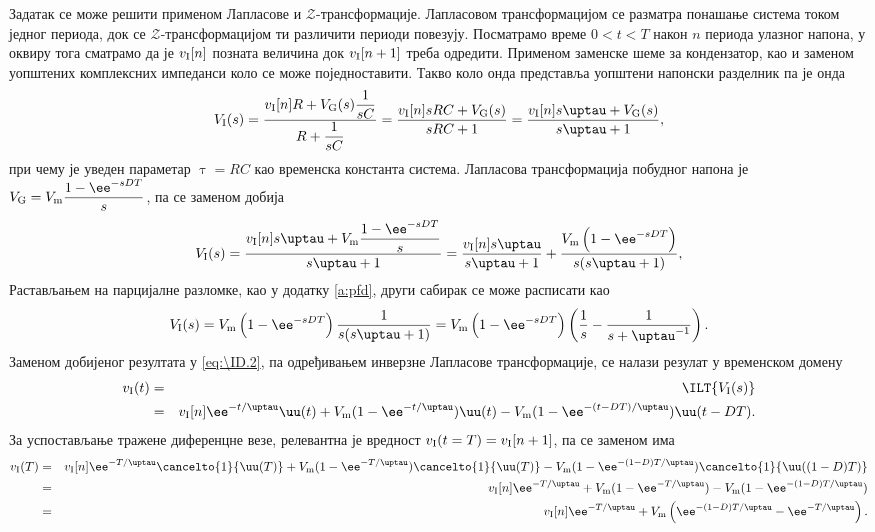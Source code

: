 Задатак се може решити применом Лапласове и $\mathcal{Z}$-трансформације. Лапласовом трансформацијом се разматра понашање система током једног периода, 
док се $\mathcal{Z}$-трансформацијом ти различити периоди повезују. Посматрамо време $0 < t < T$ након $n$ периода улазног напона, у оквиру тога 
сматрамо да је $v_{\rm I}[n]$ позната величина док $v_{\rm I}[n+1]$ треба одредити. Применом заменске шеме за кондензатор, као и заменом уопштених 
комплексних импеданси коло се може поједноставити. Такво коло онда представља уопштени напонски разделник па је онда 
\begin{eqnarray}
    V_{\rm I}(s) = \dfrac{v_{\rm I}[n] R + V_{\rm G}(s) \dfrac{1}{sC}}{R + \dfrac{1}{sC}} = 
    \dfrac{v_{\rm I}[n] sRC + V_{\rm G}(s) }{sRC + 1} = \dfrac{v_{\rm I}[n] s \uptau + V_{\rm G}(s) }{s\uptau + 1},
\end{eqnarray}
при чему је уведен параметар $\uptau = RC$ као временска константа система. Лапласова трансформација побудног напона је 
$V_{\rm G} = V_{\rm m}\dfrac{1 - \ee^{-sDT}}{s}$, па се заменом добија 
\begin{eqnarray}
    V_{\rm I}(s) = \dfrac{v_{\rm I}[n] s \uptau + V_{\rm m}\dfrac{1 - \ee^{-sDT}}{s} }{s\uptau + 1} =
       \dfrac{v_{\rm I}[n] s \uptau }{s \uptau + 1} +
       \dfrac{V_{\rm m}\left(1 - \ee^{-sDT}\right) }{s(s\uptau + 1)}, \label{eq:\ID.2}
\end{eqnarray}
Растављањем на парцијалне разломке, као у додатку \ref{a:pfd}, други сабирак се може расписати као  
\begin{eqnarray}
    V_{\rm I}(s) = 
    V_{\rm m} \left(1 - \ee^{-sDT}\right) \dfrac{ 1 }{s(s\uptau + 1)} 
    = 
    V_{\rm m} \left(1 - \ee^{-sDT}\right) \left(\dfrac{1}{s} - \dfrac{1}{s + \uptau^{-1}} \right).
\end{eqnarray}
Заменом добијеног резултата у \eqref{eq:\ID.2}, па одређивањем инверзне Лапласове трансформације, се налази резулат у временском домену
\begin{eqnarray}
    v_{\rm I}(t) &=& \ILT{V_{\rm I}(s)} \\
    &=& 
    v _{\rm I}[n] \ee^{-t/\uptau} \uu(t)
    +
    V_{\rm m}(1 - \ee^{-t/\uptau}) \uu(t)
    -
    V_{\rm m}(1 - \ee^{-(t-DT)/\uptau}) \uu(t-DT).
\end{eqnarray}
За успостављање тражене диференцне везе, релевантна је вредност $v_{\rm I}(t = T) = v_{\rm I}[n+1]$, па се заменом има
\begin{eqnarray}
    v_{\rm I}(T)
    &=&
    v _{\rm I}[n] \ee^{-T/\uptau} \cancelto{1}{\uu(T)}
    +
    V_{\rm m}(1 - \ee^{-T/\uptau}) \cancelto{1}{\uu(T)}
    -
    V_{\rm m}(1 - \ee^{-(1-D)T/\uptau}) \cancelto{1}{\uu((1-D)T)}
    \\
    &=&
    v _{\rm I}[n] \ee^{-T/\uptau}
    +
    V_{\rm m}(1 - \ee^{-T/\uptau})
    -
    V_{\rm m}(1 - \ee^{-(1-D)T/\uptau})
    \\ 
    &=&
    v _{\rm I}[n] \ee^{-T/\uptau}
    +
    V_{\rm m}
    \left(
         \ee^{-(1-D)T/\uptau} - \ee^{-T/\uptau}
    \right).
\end{eqnarray}
